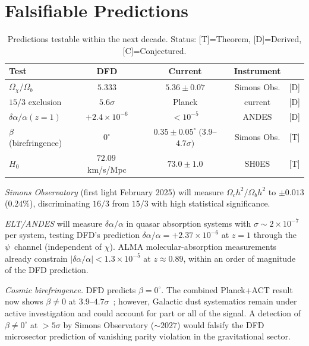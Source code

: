 \documentclass[aps,prd,twocolumn,superscriptaddress,showpacs,floatfix,nofootinbib]{revtex4-2}
\theoremstyle{definition}
\theoremstyle{remark}
\newcommand{\grade}[1]{\textsf{\footnotesize [#1]}}
\begin{document}
\section{Falsifiable Predictions}
\label{sec:predictions}

\begin{table}[t]
\caption{Predictions testable within the next decade.
Status: \grade{T}=Theorem, \grade{D}=Derived,
\grade{C}=Conjectured.}
\label{tab:predictions}
\begin{ruledtabular}
\begin{tabular}{lcccc}
Test & DFD & Current & Instrument & \\
\hline
$\Omega_\chi/\Omega_b$ & $5.333$ & $5.36\pm 0.07$ & Simons Obs. & \grade{D} \\
$15/3$ exclusion & $5.6\sigma$ & Planck & current & \grade{D} \\
$\delta\alpha/\alpha(z{=}1)$ &
  $+2.4{\times}10^{-6}$ & $<10^{-5}$ & ANDES & \grade{D} \\
$\beta$ (birefringence) & $0^\circ$ &
  $0.35\pm 0.05^\circ\;(3.9$--$4.7\sigma)$ & Simons Obs. & \grade{T} \\
$H_0$ & $72.09$\,km/s/Mpc &
  $73.0\pm 1.0$ & SH0ES & \grade{T} \\
\end{tabular}
\end{ruledtabular}
\end{table}

\emph{Simons Observatory} (first light February 2025) will measure
$\Omega_c h^2/\Omega_b h^2$ to $\pm 0.013$ ($0.24\%$),
discriminating $16/3$ from $15/3$ with high statistical significance.

\emph{ELT/ANDES} will measure $\delta\alpha/\alpha$
in quasar absorption systems with
$\sigma\sim 2\times 10^{-7}$ per system, testing DFD's
prediction $\delta\alpha/\alpha = +2.37\times 10^{-6}$
at $z=1$ through the $\psi$~channel (independent of
$\chi$). ALMA molecular-absorption measurements already
constrain $|\delta\alpha/\alpha| < 1.3\times 10^{-5}$ at
$z\approx 0.89$, within an order of magnitude of the DFD
prediction.

\emph{Cosmic birefringence.} DFD predicts $\beta=0^\circ$.
The combined Planck+ACT result now shows $\beta\neq 0$ at
$3.9$--$4.7\sigma$~\cite{DiegoPalazuelos2023}; however,
Galactic dust systematics remain under active investigation
and could account for part or all of the signal. A detection of
$\beta\neq 0^\circ$ at ${>}5\sigma$ by Simons Observatory
(${\sim}2027$) would falsify the DFD microsector prediction
of vanishing parity violation in the gravitational sector.
\end{document}
